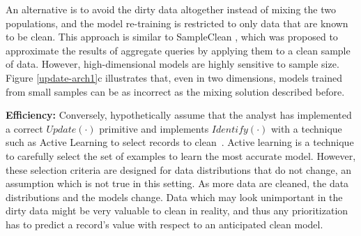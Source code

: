 An alternative is to avoid the dirty data altogether instead of mixing the two populations, and the model re-training is restricted to only data that are known to be clean.
This approach is similar to SampleClean \cite{wang1999sample}, which was proposed to approximate the results of aggregate queries by applying them to a clean sample of data.
However, high-dimensional models are highly sensitive to sample size.
Figure \ref{update-arch1}c illustrates that, even in two dimensions, models trained from small samples can be as incorrect as the mixing solution described before.

\vspace{0.5em} 

\textbf{Efficiency: } Conversely, hypothetically assume that the analyst has implemented a correct $Update(\cdot)$ primitive and implements $Identify(\cdot)$ with a technique such as Active Learning to select records to clean~\cite{yakout2013don,DBLP:journals/pvldb/YakoutENOI11,gokhale2014corleone}.
Active learning is a technique to carefully select the set of examples to learn the most accurate model.
However, these selection criteria are designed for data distributions that do not change, an assumption which is not true in this setting.
As more data are cleaned, the data distributions and the models change.
Data which may look unimportant in the dirty data might be very valuable to clean in reality, and thus any prioritization has to predict a record's value with respect to an anticipated clean model.



